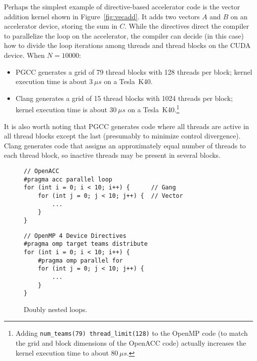 \documentclass{sig-alternate-05-2015}
\begin{document}
Perhaps the simplest example of directive-based accelerator code is the vector
addition kernel shown in Figure~\ref{fig:vecadd}.  It adds two vectors $A$ and
$B$ on an accelerator device, storing the sum in $C$.  While the directives
direct the compiler to parallelize the loop on the accelerator, the compiler
can decide (in this case) how to divide the loop iterations among threads
and thread blocks on the CUDA device.  When $N = 10000$:
\begin{itemize}
\item PGCC generates a grid of 79 thread blocks with 128 threads per block;
kernel execution time is about $3~\mu s$ on a Tesla~K40.
\item Clang generates a grid of 15 thread blocks with 1024 threads per block;
kernel execution time is about $30~\mu s$ on a Tesla~K40.\footnote{Adding
\texttt{num\_teams(79) thread\_limit(128)} to the OpenMP code (to match the
grid and block dimensions of the OpenACC code) actually increases the kernel
execution time to about $80~\mu s$.
}
\end{itemize}

It is also worth noting that PGCC generates code where all threads are active
in all thread blocks except the last (presumably to minimize control
divergence).  Clang generates code that assigns an approximately equal number
of threads to each thread block, so inactive threads may be present in
several blocks.

\begin{figure*}
\begin{minipage}{.5\textwidth}
{\footnotesize
\begin{verbatim}
// OpenACC
#pragma acc parallel loop
for (int i = 0; i < 10; i++) {      // Gang
    for (int j = 0; j < 10; j++) {  // Vector
        ...
    }
}

\end{verbatim}
}
\end{minipage}
\begin{minipage}{.5\textwidth}
{\footnotesize
\begin{verbatim}
// OpenMP 4 Device Directives
#pragma omp target teams distribute
for (int i = 0; i < 10; i++) {
    #pragma omp parallel for
    for (int j = 0; j < 10; j++) {
        ...
    }
}
\end{verbatim}
}
\end{minipage}
\caption{Doubly nested loops.}
\label{fig:nest}
\end{figure*}
\end{document}
